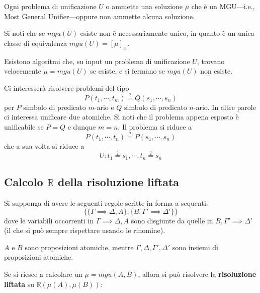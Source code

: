 \begin{teo}[di Unificazione]
Ogni problema di unificazione $U$ o ammette una soluzione $\mu$ che è un MGU—i.e., Most General Unifier—oppure non ammette alcuna soluzione.
\end{teo}
Si noti che se $mgu(U)$ esiste non è necessariamente unico, in quanto è un unica classe di equivalenza $mgu(U) = [\mu]_{\equiv}$.

Esistono algoritmi che, su input un problema di unificazione $U$, trovano velocemente $\mu = mgu(U)$ se esiste, e si fermano se $mgu(U)$ non esiste.

Ci interesserà risolvere problemi del tipo 
$$
P(t_1, \cdots, t_m) \stackrel{?}{=} Q(s_1, \cdots, s_n)
$$
per $P$ simbolo di predicato $m$-ario e $Q$ simbolo di predicato $n$-ario. In 
altre parole ci interessa unificare due atomiche. Si noti che il problema appena 
esposto è unificabile se $P = Q$ e dunque $m = n$. Il problema si riduce a 
$$
P(t_1, \cdots, t_n) \stackrel{?}{=} P(s_1, \cdots, s_n)
$$
che a sua volta si riduce a 
$$
U: t_1 \stackrel{?}{=}s_1, \cdots, t_n \stackrel{?}{=}s_n
$$

\subsection{Calcolo $\mathbb{R}$ della risoluzione liftata}
Si supponga di avere le seguenti regole scritte in forma 
a sequenti: 
$$
\{\{\Gamma \implies \Delta, A\}, \{B, \Gamma' \implies \Delta'\}\}
$$
dove le variabili occorrenti in $\Gamma \implies \Delta, A$ sono disgiunte da quelle in $B, \Gamma' \implies \Delta'$ (il che si può sempre rispettare usando le rinomine). 

$A$ e $B$ sono proposizioni atomiche, mentre $\Gamma, \Delta, \Gamma', \Delta'$ sono insiemi di proposizioni atomiche.

Se si riesce a calcolare un $\mu = mgu(A,B)$, allora si può risolvere la \textbf{risoluzione liftata} su $\mathbb{R}(\mu(A), \mu(B))$: 
\begin{prooftree}
\end{prooftree}

